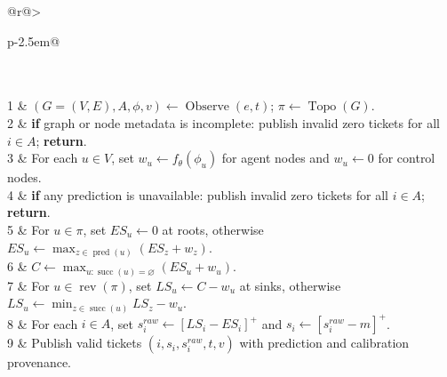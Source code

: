 \begin{algorithm}[t]
\caption{Causal GBDT--CPM update with calibrated Slack}
\label{alg:slack-update}
\begin{tabular}{@{}r@{\hspace{0.5em}}>{\raggedright\arraybackslash}p{\dimexpr\columnwidth-2.5em\relax}@{}}
\\
\\
1 & $(G=(V,E),A,\phi,v)\gets\operatorname{Observe}(e,t)$; $\pi\gets\operatorname{Topo}(G)$.\\
2 & \textbf{if} graph or node metadata is incomplete: publish invalid zero tickets for all $i\in A$; \textbf{return}.\\
3 & For each $u\in V$, set $w_u\gets f_\theta(\phi_u)$ for agent nodes and $w_u\gets0$ for control nodes.\\
4 & \textbf{if} any prediction is unavailable: publish invalid zero tickets for all $i\in A$; \textbf{return}.\\
5 & For $u\in\pi$, set $ES_u\gets0$ at roots, otherwise $ES_u\gets\max_{z\in\operatorname{pred}(u)}(ES_z+w_z)$.\\
6 & $C\gets\max_{u:\operatorname{succ}(u)=\varnothing}(ES_u+w_u)$.\\
7 & For $u\in\operatorname{rev}(\pi)$, set $LS_u\gets C-w_u$ at sinks, otherwise $LS_u\gets\min_{z\in\operatorname{succ}(u)}LS_z-w_u$.\\
8 & For each $i\in A$, set $s_i^{raw}\gets[LS_i-ES_i]^+$ and $s_i\gets[s_i^{raw}-m]^+$.\\
9 & Publish valid tickets $(i,s_i,s_i^{raw},t,v)$ with prediction and calibration provenance.\\
\end{tabular}
\end{algorithm}

